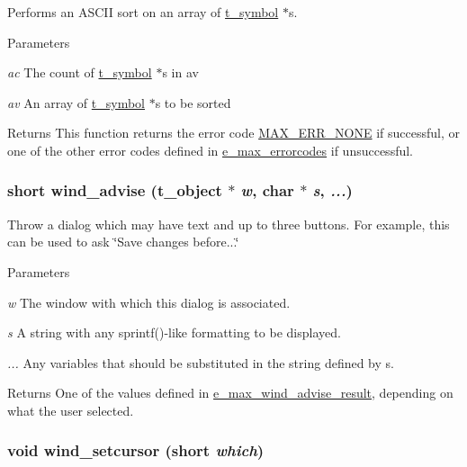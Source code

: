 Performs an ASCII sort on an array of \hyperlink{structt__symbol}{t\_\-symbol} $\ast$s. 
\begin{DoxyParams}{Parameters}
\item[{\em ac}]The count of \hyperlink{structt__symbol}{t\_\-symbol} $\ast$s in {\ttfamily av} \item[{\em av}]An array of \hyperlink{structt__symbol}{t\_\-symbol} $\ast$s to be sorted\end{DoxyParams}
\begin{DoxyReturn}{Returns}
This function returns the error code \hyperlink{group__misc_gga0764dd6c02b76cca7d053ae50555d69da6d22f77fef8b1e1b074cef5d29d935fd}{MAX\_\-ERR\_\-NONE} if successful, or one of the other error codes defined in \hyperlink{group__misc_ga0764dd6c02b76cca7d053ae50555d69d}{e\_\-max\_\-errorcodes} if unsuccessful. 
\end{DoxyReturn}
\hypertarget{group__misc_gab127ce8d89ae72d420a44642c52cc94d}{
\subsubsection[{wind\_\-advise}]{\setlength{\rightskip}{0pt plus 5cm}short wind\_\-advise ({\bf t\_\-object} $\ast$ {\em w}, \/  char $\ast$ {\em s}, \/   {\em ...})}}
\label{group__misc_gab127ce8d89ae72d420a44642c52cc94d}


Throw a dialog which may have text and up to three buttons. For example, this can be used to ask \char`\"{}Save changes before...\char`\"{}


\begin{DoxyParams}{Parameters}
\item[{\em w}]The window with which this dialog is associated. \item[{\em s}]A string with any sprintf()-\/like formatting to be displayed. \item[{\em ...}]Any variables that should be substituted in the string defined by s. \end{DoxyParams}
\begin{DoxyReturn}{Returns}
One of the values defined in \hyperlink{group__misc_ga4cf665eb75774ae52451e04f91747c25}{e\_\-max\_\-wind\_\-advise\_\-result}, depending on what the user selected. 
\end{DoxyReturn}
\hypertarget{group__misc_ga85a1754ef77207af4ab7617e7487336e}{
\subsubsection[{wind\_\-setcursor}]{\setlength{\rightskip}{0pt plus 5cm}void wind\_\-setcursor (short {\em which})}}
\label{group__misc_ga85a1754ef77207af4ab7617e7487336e}



